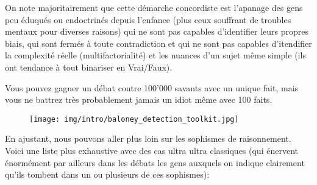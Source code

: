 	On note majoritairement que cette démarche concordiste est l'apanage des gens peu éduqués ou endoctrinés depuis l'enfance (plus ceux souffrant de troubles mentaux pour diverses raisons) qui ne sont pas capables d'identifier leurs propres biais,  qui sont fermés à toute contradiction et qui ne sont pas capables d'itendifier la complexité réelle (multifactorialité) et les nuances d'un sujet même simple (ils ont tendance à tout binariser en Vrai/Faux).
	
	\begin{fquote}Vous pouvez gagner un débat contre 100'000 savants avec un unique fait, mais vous ne battrez très probablement jamais un idiot même avec 100 faits.
 	\end{fquote}
	
	\begin{figure}[H]
		\centering
		\texttt{[image: img/intro/baloney\_detection\_toolkit.jpg]}
	\end{figure}
	En ajustant, nous pouvons aller plus loin sur les sophismes de raisonnement. Voici une liste plus exhaustive avec des cas ultra ultra classiques (qui \'enervent \'enorm\'ement par ailleurs dans les d\'ebats les gens auxquels on indique clairement qu'ils tombent dans un ou plusieurs de ces sophismes):
